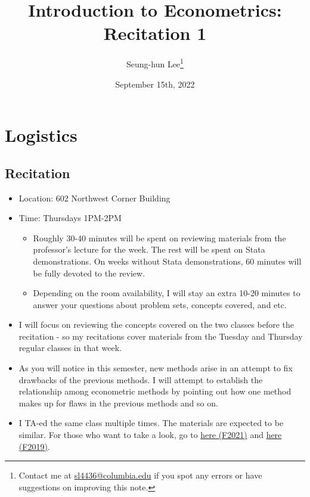 \documentclass[12pt]{article}
\title{Introduction to Econometrics: Recitation 1}
\theoremstyle{definition}
\theoremstyle{property}
\theoremstyle{assumption}
\theoremstyle{example}
\theoremstyle{comment}
\begin{document}
\linespread{1.25}
\onehalfspacing

\author{Seung-hun Lee\footnote{Contact me at \href{mailto:sl4436@columbia.edu}{sl4436@columbia.edu} if you spot any errors or have suggestions on improving this note.}}
\date{September 15th, 2022}
\maketitle
\thispagestyle{firstpage}

\section{Logistics}
\subsection{Recitation}
\begin{itemize}
\item Location: 602 Northwest Corner Building
\item Time: Thursdays 1PM-2PM 
\begin{itemize}
\item Roughly 30-40 minutes will be spent on reviewing materials from the professor's lecture for the week. The rest will be spent on Stata demonstrations. On weeks without Stata demonstrations, 60 minutes will be fully devoted to the review. 
\item Depending on the room availability, I will stay an extra 10-20 minutes to answer your questions about problem sets, concepts covered, and etc.  
\end{itemize}
\item I will focus on reviewing the concepts covered on the two classes before the recitation - so my recitations cover materials from the Tuesday and Thursday regular classes in that week. 
\item As you will notice in this semester, new methods arise in an attempt to fix drawbacks of the previous methods. I will attempt to establish the relationship among econometric methods by pointing out how one method makes up for flaws in the previous methods and so on. 
\item I TA-ed the same class multiple times. The materials are expected to be similar. For those who want to take a look, go to \href{https://github.com/seunghunlee918/ugrad_introtometrics_2021f}{here (F2021)} and \href{https://github.com/seunghunlee918/ugrad_introtometrics}{here (F2019)}.
\end{itemize}
\end{document}
